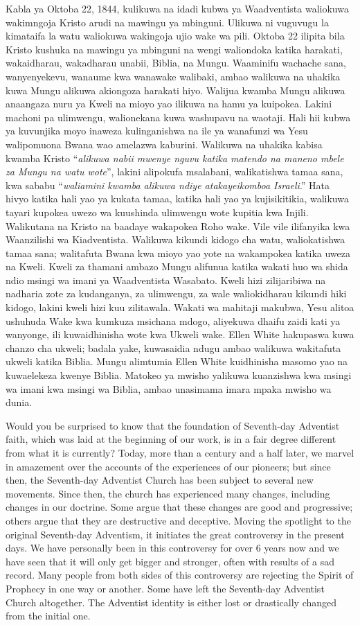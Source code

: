 Kabla ya Oktoba 22, 1844, kulikuwa na idadi kubwa ya Waadventista waliokuwa wakimngoja Kristo arudi na mawingu ya mbinguni. Ulikuwa ni vuguvugu la kimataifa la watu waliokuwa wakingoja ujio wake wa pili. Oktoba 22 ilipita bila Kristo kushuka na mawingu ya mbinguni na wengi waliondoka katika harakati, wakaidharau, wakadharau unabii, Biblia, na Mungu. Waaminifu wachache sana, wanyenyekevu, wanaume kwa wanawake walibaki, ambao walikuwa na uhakika kuwa Mungu alikuwa akiongoza harakati hiyo. Walijua kwamba Mungu alikuwa anaangaza nuru ya Kweli na mioyo yao ilikuwa na hamu ya kuipokea. Lakini machoni pa ulimwengu, walionekana kuwa washupavu na waotaji. Hali hii kubwa ya kuvunjika moyo inaweza kulinganishwa na ile ya wanafunzi wa Yesu walipomuona Bwana wao amelazwa kaburini. Walikuwa na uhakika kabisa kwamba Kristo “\textit{alikuwa nabii mwenye nguvu katika matendo na maneno mbele za Mungu na watu wote}”, lakini alipokufa msalabani, walikatishwa tamaa sana, kwa sababu “\textit{waliamini kwamba alikuwa ndiye atakayeikomboa Israeli}.” Hata hivyo katika hali yao ya kukata tamaa, katika hali yao ya kujisikitikia, walikuwa tayari kupokea uwezo wa kuushinda ulimwengu wote kupitia kwa Injili. Walikutana na Kristo na baadaye wakapokea Roho wake. Vile vile ilifanyika kwa Waanzilishi wa Kiadventista. Walikuwa kikundi kidogo cha watu, waliokatishwa tamaa sana; walitafuta Bwana kwa mioyo yao yote na wakampokea katika uweza na Kweli. Kweli za thamani ambazo Mungu alifunua katika wakati huo wa shida ndio msingi wa imani ya Waadventista Wasabato. Kweli hizi zilijaribiwa na nadharia zote za kudanganya, za ulimwengu, za wale waliokidharau kikundi hiki kidogo, lakini kweli hizi kuu zilitawala. Wakati wa mahitaji makubwa, Yesu alitoa ushuhuda Wake kwa kumkuza msichana mdogo, aliyekuwa dhaifu zaidi kati ya wanyonge, ili kuwaidhinisha wote kwa Ukweli wake. Ellen White hakupaswa kuwa chanzo cha ukweli; badala yake, kuwasaidia ndugu ambao walikuwa wakitafuta ukweli katika Biblia. Mungu alimtumia Ellen White kuidhinisha masomo yao na kuwaelekeza kwenye Biblia. Matokeo ya mwisho yalikuwa kuanzishwa kwa msingi wa imani kwa msingi wa Biblia, ambao unasimama imara mpaka mwisho wa dunia.


Would you be surprised to know that the foundation of Seventh-day Adventist faith, which was laid at the beginning of our work, is in a fair degree different from what it is currently? Today, more than a century and a half later, we marvel in amazement over the accounts of the experiences of our pioneers; but since then, the Seventh-day Adventist Church has been subject to several new movements. Since then, the church has experienced many changes, including changes in our doctrine. Some argue that these changes are good and progressive; others argue that they are destructive and deceptive. Moving the spotlight to the original Seventh-day Adventism, it initiates the great controversy in the present days. We have personally been in this controversy for over 6 years now and we have seen that it will only get bigger and stronger, often with results of a sad record. Many people from both sides of this controversy are rejecting the Spirit of Prophecy in one way or another. Some have left the Seventh-day Adventist Church altogether. The Adventist identity is either lost or drastically changed from the initial one.


